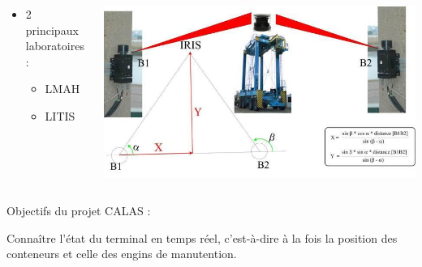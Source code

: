 \documentclass{beamer}
\begin{document}
\begin{frame}
\begin{columns}
\begin{column}[l]{5.5cm}
\begin{itemize}
		 \item 2 principaux laboratoires : 
			 \begin{itemize}
			    \item LMAH
			    \item LITIS
			  \end{itemize}
	\end{itemize}
    \end{column}
    \begin{column}[r]{4.5cm}
		\begin{flushright}
		  \includegraphics[height=.37\textheight]{fig/angles.jpg}
		\end{flushright}
    \end{column}
 \end{columns}	
	\begin{block}{Objectifs du projet CALAS : }
		\begin{minipage}[]{\columnwidth}
			Connaître l'état du terminal en temps réel, c'est-à-dire à la fois la position des conteneurs et celle des engins de manutention.
		\end{minipage}
	\end{block}
	

\end{frame}
\end{document}
